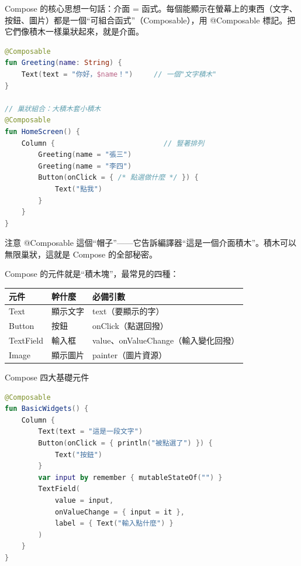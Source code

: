 


Compose 的核心思想一句話：介面 = 函式。每個能顯示在螢幕上的東西（文字、按鈕、圖片）都是一個“可組合函式”（Composable），用 @Composable 標記。把它們像積木一樣巢狀起來，就是介面。

\begin{lstlisting}[language=Kotlin]
@Composable
fun Greeting(name: String) {
    Text(text = "你好，$name！")     // 一個"文字積木"
}

// 巢狀組合：大積木套小積木
@Composable
fun HomeScreen() {
    Column {                          // 豎著排列
        Greeting(name = "張三")
        Greeting(name = "李四")
        Button(onClick = { /* 點選做什麼 */ }) {
            Text("點我")
        }
    }
}
\end{lstlisting}

注意 @Composable 這個“帽子”——它告訴編譯器“這是一個介面積木”。積木可以無限巢狀，這就是 Compose 的全部秘密。


Compose 的元件就是“積木塊”，最常見的四種：

\begin{center}
\begin{tabularx}{\linewidth}{|X|X|X|}
\hline
\textbf{元件} & \textbf{幹什麼} & \textbf{必備引數} \tabularnewline
\hline
Text & 顯示文字 & text（要顯示的字） \tabularnewline
Button & 按鈕 & onClick（點選回撥） \tabularnewline
TextField & 輸入框 & value、onValueChange（輸入變化回撥） \tabularnewline
Image & 顯示圖片 & painter（圖片資源） \tabularnewline
\hline
\end{tabularx}
\end{center}

\begin{center}\small\color{gray}Compose 四大基礎元件\end{center}

\begin{lstlisting}[language=Kotlin]
@Composable
fun BasicWidgets() {
    Column {
        Text(text = "這是一段文字")
        Button(onClick = { println("被點選了") }) {
            Text("按鈕")
        }
        var input by remember { mutableStateOf("") }
        TextField(
            value = input,
            onValueChange = { input = it },
            label = { Text("輸入點什麼") }
        )
    }
}
\end{lstlisting}

